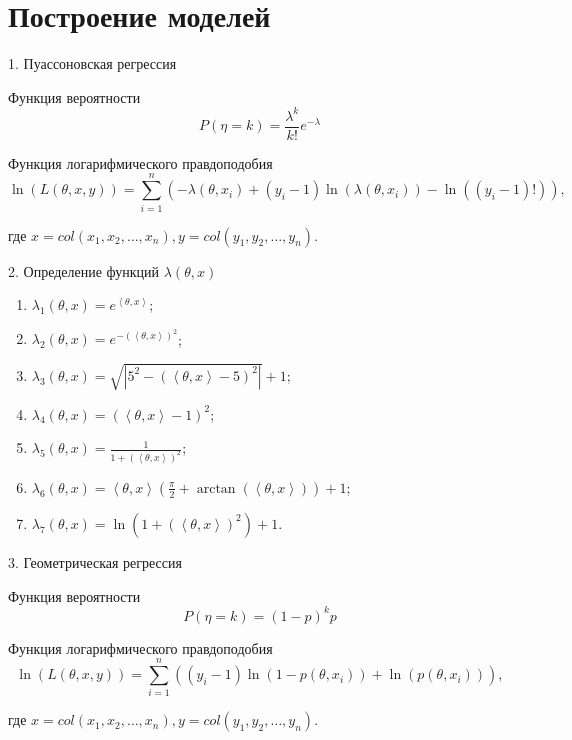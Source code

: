 \documentclass[aspectratio=169]{beamer}
\begin{document}
    \section{Построение моделей}    
    \begin{frame}{1. Пуассоновская регрессия}
        \begin{block}{Функция вероятности}
            $$P(\eta = k) = \dfrac{\lambda^k}{k!}e^{-\lambda}$$
        \end{block}
        
        \begin{block}{Функция логарифмического правдоподобия}
            $$\ln(L(\theta, x, y)) = \sum\limits_{i=1}^{n} \left( -\lambda(\theta, x_i) + (y_i - 1) \ln(\lambda(\theta, x_i)) - \ln((y_i - 1)!) \right),$$
            
            где $x = col(x_1, x_2, \ldots, x_n), y = col(y_1, y_2, \ldots, y_n)$.
        \end{block}
    \end{frame}


    \begin{frame}{2. Определение функций $\lambda(\theta, x)$}
        \begin{enumerate}
            \item $\lambda_1(\theta, x) = e^{\left\langle \theta, x\right\rangle }$;
            \item $\lambda_2(\theta, x) = e^{-(\left\langle\theta, x\right\rangle)^2}$;
            \item $\lambda_3(\theta, x) = \sqrt{|5^2 - (\left\langle\theta, x\right\rangle - 5)^2|} + 1$;
            \item $\lambda_4(\theta, x) = (\left\langle\theta, x\right\rangle - 1)^2$;
            \item $\lambda_5(\theta, x) = \frac{1}{1 + (\left\langle\theta, x\right\rangle)^2}$;
            \item $\lambda_6(\theta, x) = \left\langle\theta, x\right\rangle (\frac{\pi}{2} + \arctan(\left\langle\theta, x\right\rangle)) + 1$;
            \item $\lambda_7(\theta, x) = \ln(1 + (\left\langle\theta, x\right\rangle )^2) + 1$.
        \end{enumerate}
    \end{frame}


    \begin{frame}{3. Геометрическая регрессия}
        \begin{block}{Функция вероятности}
            $$P(\eta = k) = (1-p)^k p$$
        \end{block}
        
        \begin{block}{Функция логарифмического правдоподобия}
            $$\ln(L(\theta, x, y)) = \sum\limits_{i = 1}^n ( (y_i - 1) \ln(1 - p(\theta, x_i)) + \ln(p(\theta, x_i)) ),$$
            
            где $x = col(x_1, x_2, \ldots, x_n), y = col(y_1, y_2, \ldots, y_n)$.
        \end{block}        
    \end{frame}
\end{document}
